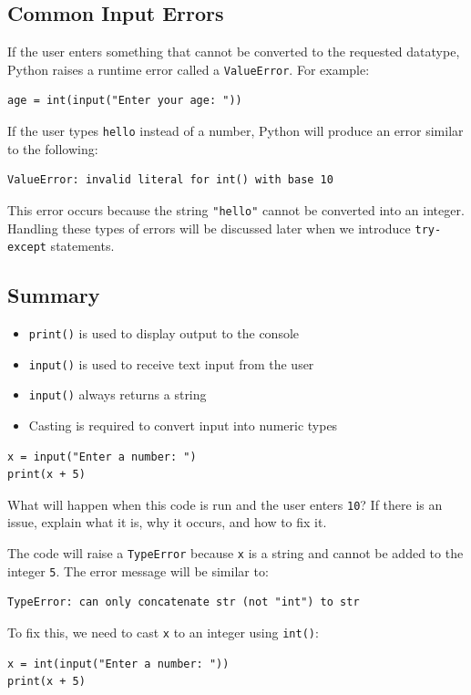 \subsection{Common Input Errors}

If the user enters something that cannot be converted to the requested datatype,
Python raises a runtime error called a \texttt{ValueError}. For example:

\begin{verbatim}
age = int(input("Enter your age: "))
\end{verbatim}

If the user types \texttt{hello} instead of a number, Python will produce an error
similar to the following:

\begin{verbatim}
ValueError: invalid literal for int() with base 10
\end{verbatim}

This error occurs because the string \texttt{"hello"} cannot be converted into an integer. Handling these types of errors will be discussed later when we introduce \texttt{try-except} statements.

\subsection{Summary}

\begin{itemize}
    \item \texttt{print()} is used to display output to the console
    \item \texttt{input()} is used to receive text input from the user
    \item \texttt{input()} always returns a string
    \item Casting is required to convert input into numeric types
\end{itemize}

\begin{Exercise}[label=input1, title=User Input Types]
\begin{verbatim}
x = input("Enter a number: ")
print(x + 5)
\end{verbatim}
What will happen when this code is run and the user enters \texttt{10}? If there is an issue, explain what it is, why it occurs, and how to fix it.
\end{Exercise}
\begin{Answer}[ref=input1]
The code will raise a \texttt{TypeError} because \texttt{x} is a string and cannot be added to the integer \texttt{5}. The error message will be similar to:
\begin{verbatim}
TypeError: can only concatenate str (not "int") to str
\end{verbatim}
To fix this, we need to cast \texttt{x} to an integer using \texttt{int()}:
\begin{verbatim}
x = int(input("Enter a number: "))
print(x + 5)
\end{verbatim}
\end{Answer}

